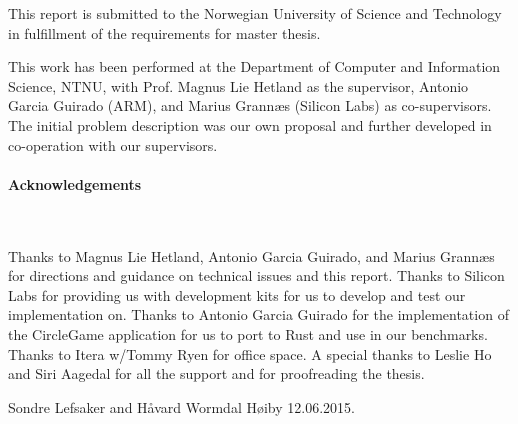 
\label{chap:preface}

This report is submitted to the Norwegian University of Science and Technology in fulfillment of the requirements for master thesis.

This work has been performed at the Department of Computer and Information Science, NTNU, with Prof. Magnus Lie Hetland as the supervisor, Antonio Garcia Guirado (ARM), and Marius Grannæs (Silicon Labs) as co-supervisors.
The initial problem description was our own proposal and further developed in co-operation with our supervisors.

\paragraph{Acknowledgements} \\ \hfill

Thanks to Magnus Lie Hetland, Antonio Garcia Guirado, and Marius Grannæs for directions and guidance on technical issues and this report.
Thanks to Silicon Labs for providing us with development kits for us to develop and test our implementation on.
Thanks to Antonio Garcia Guirado for the implementation of the CircleGame application for us to port to Rust and use in our benchmarks.
Thanks to Itera w/Tommy Ryen for office space.
A special thanks to Leslie Ho and Siri Aagedal for all the support and for proofreading the thesis.

Sondre Lefsaker and Håvard Wormdal Høiby 12.06.2015.
